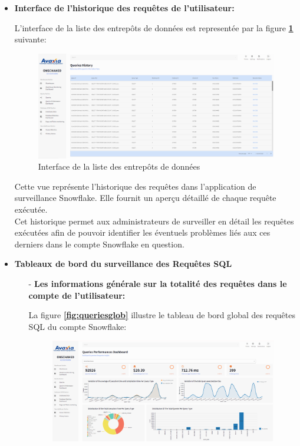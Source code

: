 \begin{itemize}
        \item \textbf{Interface de l'historique des requêtes de l'utilisateur:}
        \par L'interface de la liste des entrepôts de données est representée par la figure \textbf{\ref{fig:listqueries}} suivante:
        \begin{figure}[H]
            \centering
            \includegraphics[width =1\linewidth]{img/captures/queries/queries_list.png}
            \caption{Interface de la liste des entrepôts de données}
                \label{fig:listqueries}
            \end{figure}
            \par Cette vue représente l'historique des requêtes dans l'application de surveillance Snowflake.
             Elle fournit un aperçu détaillé de chaque requête exécutée. \\ 
             Cet historique permet aux administrateurs de surveiller en détail les requêtes exécutées afin de pouvoir identifier les éventuels problèmes liés aux ces derniers dans le compte Snowflake en question.
            \item \textbf{Tableaux de bord du surveillance des Requêtes SQL}
            \begin{enumerate}
                \item[-] \textbf{Les informations générale sur la totalité des requêtes dans le compte de l'utilisateur:  }
                    \par La figure \textbf{\ref{fig:queriesglob}} illustre le tableau de bord global des requêtes SQL du compte Snowflake:
                    \begin{figure}[H]
                        \centering
                        \includegraphics[width =1\linewidth]{img/captures/queries/global_queries_dash.png}

\end{figure}
\end{enumerate}
\end{itemize}
